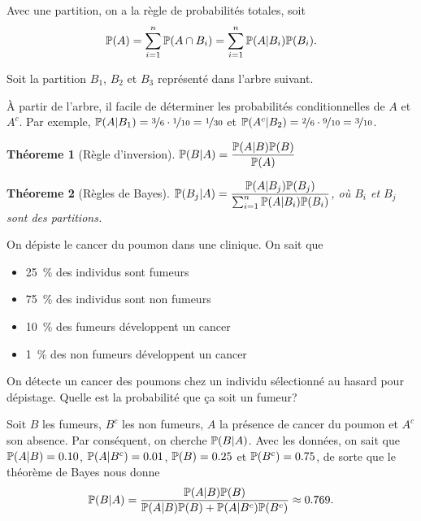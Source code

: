 \documentclass[11pt]{article}
\renewcommand\P{%
	\ensuremath{%
		\mathbb{P}%
	}%
}%
\newtheorem{theoreme}{Théoreme}[section]
\begin{document}
Avec une partition, on a la règle de probabilités totales, soit
\begin{equation*}
	\P(A)=\sum_{i=1}^n\P(A\cap B_i)=\sum_{i=1}^n\P(A|B_i)\P(B_i).
\end{equation*}

\begin{exemple}
	Soit la partition $B_1$, $B_2$ et $B_3$ représenté dans l'arbre suivant.
	\begin{figure}[H]
		\centering
		
	\end{figure}

	À partir de l'arbre, il facile de déterminer les probabilités
	conditionnelles de $A$ et $A^c$. Par exemple,
	$\P(A|B_1)=\nicefrac{3}{6}\cdot\nicefrac{1}{10}=\nicefrac{1}{30}$ et
	$\P(A^c|B_2)=\nicefrac{2}{6}\cdot\nicefrac{9}{10}=\nicefrac{3}{10}$.
\end{exemple}

\begin{theoreme}[Règle d'inversion]
	$\P(B|A)=\dfrac{\P(A|B)\P(B)}{\P(A)}$
\end{theoreme}

\begin{theoreme}[Règles de Bayes]
	$\P(B_j|A)=\dfrac{\P(A|B_j)\P(B_j)}{\sum_{i=1}^n\P(A|B_i)\P(B_i)}$, où $B_i$ et
	$B_j$ sont des partitions.
\end{theoreme}

\begin{exemple}
	On dépiste le cancer du poumon dans une clinique. On sait que 
	\begin{itemize}
		\item\SI{25}{\percent} des individus sont fumeurs
		\item\SI{75}{\percent} des individus sont non fumeurs
		\item\SI{10}{\percent} des fumeurs développent un cancer
		\item\SI{1 }{\percent} des non fumeurs développent un cancer
	\end{itemize}

	On détecte un cancer des poumons chez un individu sélectionné au hasard
	pour dépistage. Quelle est la probabilité que ça soit un fumeur?

	Soit $B$ les fumeurs, $B^c$ les non fumeurs, $A$ la présence de cancer du
	poumon et $A^c$ son absence. Par conséquent, on cherche $\P(B|A)$. Avec les
	données, on sait que $\P(A|B)=\SI{0.10}{}$, $\P(A|B^c)=\SI{0.01}{}$,
	$\P(B)=\SI{0.25}{}$ et $\P(B^c)=\SI{0.75}{}$, de sorte que le théorème de
	Bayes nous donne
	\begin{equation*}
		\P(B|A)=\frac{\P(A|B)\P(B)}{\P(A|B)\P(B)+\P(A|B^c)\P(B^c)}\approx\SI{0.769}{}.
	\end{equation*}
\end{exemple}
\end{document}
